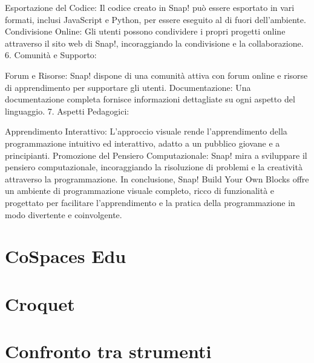 Esportazione del Codice: Il codice creato in Snap! può essere esportato in vari formati, inclusi JavaScript e Python, per essere eseguito al di fuori dell'ambiente.
Condivisione Online: Gli utenti possono condividere i propri progetti online attraverso il sito web di Snap!, incoraggiando la condivisione e la collaborazione.
6. Comunità e Supporto:

Forum e Risorse: Snap! dispone di una comunità attiva con forum online e risorse di apprendimento per supportare gli utenti.
Documentazione: Una documentazione completa fornisce informazioni dettagliate su ogni aspetto del linguaggio.
7. Aspetti Pedagogici:

Apprendimento Interattivo: L'approccio visuale rende l'apprendimento della programmazione intuitivo ed interattivo, adatto a un pubblico giovane e a principianti.
Promozione del Pensiero Computazionale: Snap! mira a sviluppare il pensiero computazionale, incoraggiando la risoluzione di problemi e la creatività attraverso la programmazione.
In conclusione, Snap! Build Your Own Blocks offre un ambiente di programmazione visuale completo, ricco di funzionalità e progettato per facilitare l'apprendimento e la pratica della programmazione in modo divertente e coinvolgente.
\section{CoSpaces Edu}
\section{Croquet}
\section{Confronto tra strumenti}